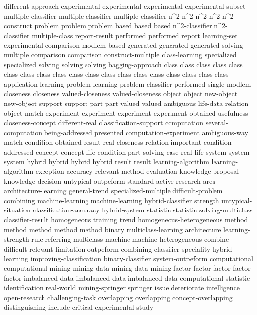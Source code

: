 different-approach	
experimental	experimental	experimental	experimental	
subset	
multiple-classifier	multiple-classifier	multiple-classifier	
n^2	n^2	n^2	n^2	n^2	
construct	
problem	problem	problem	
based	based	based	
n^2-classifier	n^2-classifier	
multiple-class	
report-result	
performed	performed	
report	
learning-set	
experimental-comparison	
modlem-based	
generated	generated	generated	
solving-multiple	
comparison	comparison	
construct-multiple	
class-learning	
specialized	specialized	
solving	solving	solving	
bagging-approach	
class	class	class	class	class	class	class	class	class	class	class	class	class	class	class	class	class	class	class	
application	
learning-problem	learning-problem	
classifier-performed	
single-modlem	
closeness	closeness	
valued-closeness	valued-closeness	
object	object	
new-object	new-object	
support	support	
part	part	
valued	valued	
ambiguous	
life-data	
relation	
object-match	
experiment	experiment	experiment	experiment	
obtained	
usefulness	
closeness-concept	
different-real	
classification-support	
computation	
several-computation	
being-addressed	
presented	
computation-experiment	
ambiguous-way	
match-condition	
obtained-result	
real	
closeness-relation	
important	
condition	
addressed	
concept	concept	
life	
condition-part	
solving-case	
real-life	
system	system	system	
hybrid	hybrid	hybrid	hybrid	
result	result	
learning-algorithm	learning-algorithm	
exception	
accuracy	
relevant-method	
evaluation	
knowledge	
proposal	
knowledge-decision	
untypical	
outpeform-standard	
active	
research-area	
architecture-learning	
general-trend	
specialized-multiple	
difficult-problem	
combining	
machine-learning	machine-learning	
hybrid-classifier	
strength	
untypical-situation	
classification-accuracy	
hybrid-system	
statistic	statistic	
solving-multiclass	
classifier-result	
homogeneous	
training	
trend	
homogeneous-heterogeneous	
method	method	method	method	method	
binary	
multiclass-learning	
architecture	
learning-strength	
rule-referring	
multiclass	
machine	machine	
heterogeneous	
combine	
difficult	
relevant	
limitation	
outpeform	
combining-classifier	
speciality	
hybrid-learning	
improving-classification	
binary-classifier	
system-outpeform	
computational	computational	
mining	mining	
data-mining	data-mining	
factor	factor	factor	factor	factor	
imbalanced-data	imbalanced-data	imbalanced-data	
computational-statistic	
identification	
real-world	
mining-springer	
springer	
issue	
deteriorate	
intelligence	
open-research	
challenging-task	
overlapping	overlapping	
concept-overlapping	
distinguishing	
include-critical	
experimental-study	
